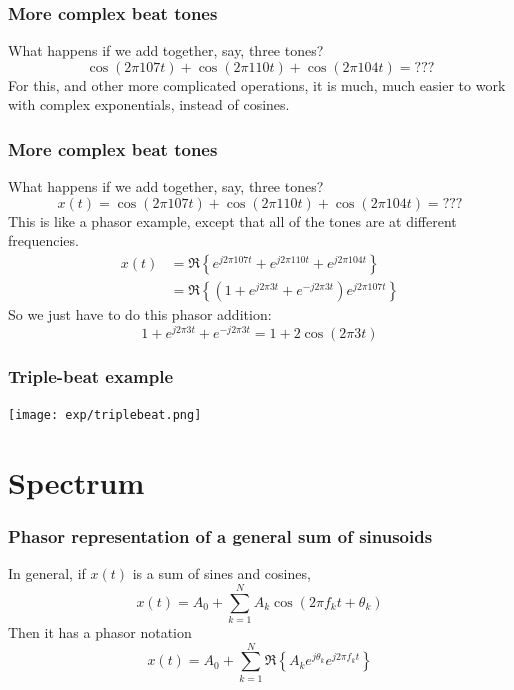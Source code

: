 \documentclass{beamer}
\begin{document}

\begin{frame}
  \frametitle{More complex beat tones}

  What happens if we add together, say, three tones?
  \[
  \cos(2\pi 107t) + \cos(2\pi 110t)+\cos(2\pi 104t)=\mbox{???}
  \]
  For this, and other more complicated operations, it
  is much, much easier to work with complex exponentials, instead of cosines.
\end{frame}
  

\begin{frame}
  \frametitle{More complex beat tones}

  What happens if we add together, say, three tones?
  \[
  x(t) = \cos(2\pi 107t) + \cos(2\pi 110t)+\cos(2\pi 104t)=\mbox{???}
  \]
  This is like a phasor example, except that all of the tones are at
  different frequencies.
  \begin{align*}
    x(t) &= \Re\left\{e^{j2\pi 107t}+e^{j2\pi 110t}+e^{j2\pi 104t}\right\}\\
    &= \Re\left\{\left(1+e^{j2\pi 3t}+e^{-j2\pi 3t}\right)e^{j2\pi 107t}\right\}
  \end{align*}
  So we just have to do this phasor addition:
  \[
  1+e^{j2\pi 3t}+e^{-j2\pi 3t} = 1 + 2\cos\left(2\pi 3t\right)
  \]
\end{frame}

\begin{frame}
  \frametitle{Triple-beat example}

  \centerline{\texttt{[image: exp/triplebeat.png]}}
\end{frame}

\section[Spectrum]{Spectrum}
\setcounter{subsection}{1}

\begin{frame}
  \frametitle{Phasor representation of a general sum of sinusoids}

  In general, if $x(t)$ is a sum of sines and cosines,
  \[
  x(t) = A_0 + \sum_{k=1}^N A_k\cos\left(2\pi f_kt+\theta_k\right)
  \]
  Then it has a phasor notation
  \[
  x(t) = A_0+\sum_{k=1}^N\Re\left\{A_ke^{j\theta_k}e^{j2\pi f_kt}\right\}
  \]
\end{frame}
\end{document}
